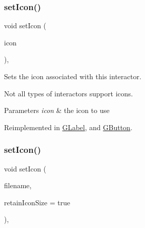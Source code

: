 \mbox{\label{classGInteractor_a368e1a338f84401c284506d03b1ba769}} 
\subsubsection{\texorpdfstring{set\+Icon()}{setIcon()}\hspace{0.1cm}{\footnotesize\ttfamily [2/3]}}
{\footnotesize\ttfamily void set\+Icon (\begin{DoxyParamCaption}\item[{const Q\+Pixmap \&}]{icon }\end{DoxyParamCaption})\hspace{0.3cm}{\ttfamily [virtual]}, {\ttfamily [inherited]}}



Sets the icon associated with this interactor. 

Not all types of interactors support icons. 
\begin{DoxyParams}{Parameters}
{\em icon} & the icon to use \\
\hline
\end{DoxyParams}


Reimplemented in \mbox{\hyperlink{classGLabel_acb5275b880ff622d306f8f33428b4e34}{G\+Label}}, and \mbox{\hyperlink{classGButton_acb5275b880ff622d306f8f33428b4e34}{G\+Button}}.

\mbox{\label{classGInteractor_a762e139aa311461c3984d3ad28293f64}} 
\subsubsection{\texorpdfstring{set\+Icon()}{setIcon()}\hspace{0.1cm}{\footnotesize\ttfamily [3/3]}}
{\footnotesize\ttfamily void set\+Icon (\begin{DoxyParamCaption}\item[{const std\+::string \&}]{filename,  }\item[{bool}]{retain\+Icon\+Size = {\ttfamily true} }\end{DoxyParamCaption})\hspace{0.3cm}{\ttfamily [virtual]}, {\ttfamily [inherited]}}



